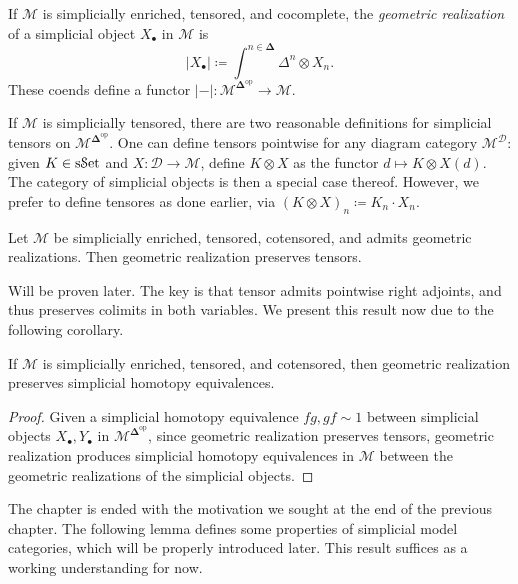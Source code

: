 \begin{definition}\label{dfn:3.11}
	If $\mathcal{M} $ is simplicially enriched, tensored, and cocomplete, the \emph{geometric realization} of a simplicial object $X_{\bullet} $ in $\mathcal{M} $ is
	\[
		\left| X_{\bullet}  \right| \coloneqq \int^{n\in\boldsymbol{\Delta} } \Delta^n\otimes X_n
	.\]
	These coends define a functor $\left| - \right| : \mathcal{M} ^{\boldsymbol{\Delta} ^{\mathrm{op}}}  \to \mathcal{M} $.
\end{definition}

If $\mathcal{M} $ is simplicially tensored, there are two reasonable definitions for simplicial tensors on $\mathcal{M} ^{\boldsymbol{\Delta} ^{\mathrm{op}} } $. One can define tensors pointwise for any diagram category $\mathcal{M} ^{\mathcal{D} } $: given $K\in\mathrm{s}\mathcal{S}\mathrm{et}$ and $X : \mathcal{D}  \to \mathcal{M} $, define $K\otimes X$ as the functor $d\mapsto K\otimes X(d)$. The category of simplicial objects is then a special case thereof. However, we prefer to define tensores as done earlier, via $(K\otimes X)_n\coloneqq K_n\cdot X_n$.

\begin{lemma}\label{lma:3.6}
	Let $\mathcal{M} $ be simplicially enriched, tensored, cotensored, and admits geometric realizations. Then geometric realization preserves tensors.
\end{lemma}
Will be proven later. The key is that tensor admits pointwise right adjoints, and thus preserves colimits in both variables. We present this result now due to the following corollary.

\begin{corollary}\label{cor:3.2}
	If $\mathcal{M} $ is simplicially enriched, tensored, and cotensored, then geometric realization preserves simplicial homotopy equivalences.
\end{corollary}
\begin{proof}
	Given a simplicial homotopy equivalence $fg,gf\sim 1$ between simplicial objects $X_{\bullet} ,Y_{\bullet} $ in $\mathcal{M} ^{\boldsymbol{\Delta} ^{\mathrm{op}} } $, since geometric realization preserves tensors, geometric realization produces simplicial homotopy equivalences in $\mathcal{M} $ between the geometric realizations of the simplicial objects.
\end{proof}

The chapter is ended with the motivation we sought at the end of the previous chapter. The following lemma defines some properties of simplicial model categories, which will be properly introduced later. This result suffices as a working understanding for now.

